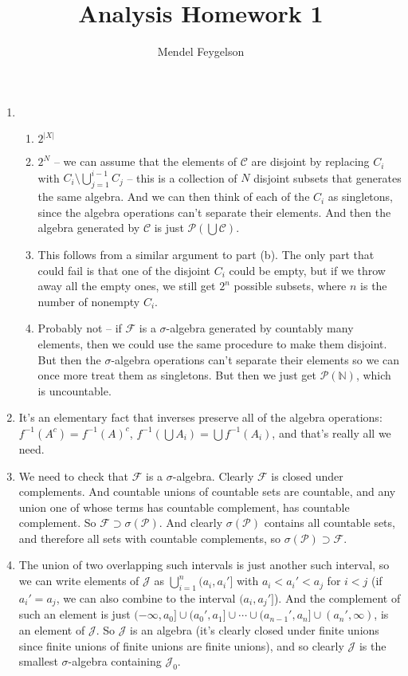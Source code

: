 \documentclass{article}
\title{Analysis Homework 1}
\author{Mendel Feygelson}
\newcommand\C{\mathscr C}
\renewcommand\P{\mathscr P}
\newcommand\F{\mathscr F}
\newcommand\NN{\mathbb N}
\newcommand\J{\mathscr J}
\begin{document}
\maketitle
\begin{enumerate}

  \item 

    \begin{enumerate}

      \item $2^{|X|}$
      \item $2^N$ -- we can assume that the elements of $\C$ are disjoint by replacing $C_i$ with $C_i \setminus \bigcup_{j=1}^{i-1} C_j$ -- this is a collection of $N$ disjoint subsets that generates the same algebra. And we can then think of each of the $C_i$ as singletons, since the algebra operations can't separate their elements. And then the algebra generated by $\C$ is just $\P(\bigcup\C)$.
      \item This follows from a similar argument to part (b). The only part that could fail is that one of the disjoint $C_i$ could be empty, but if we throw away all the empty ones, we still get $2^n$ possible subsets, where $n$ is the number of nonempty $C_i$.
      \item Probably not -- if $\F$ is a $\sigma$-algebra generated by countably many elements, then we could use the same procedure to make them disjoint. But then the $\sigma$-algebra operations can't separate their elements so we can once more treat them as singletons. But then we just get $\P(\NN)$, which is uncountable.

    \end{enumerate}
    
  \item It's an elementary fact that inverses preserve all of the algebra operations: $f^{-1}(A^c) = f^{-1}(A)^c$, $f^{-1}(\bigcup A_i) = \bigcup f^{-1}(A_i)$, and that's really all we need.
  
  \item We need to check that $\F$ is a $\sigma$-algebra. Clearly $\F$ is closed under complements. And countable unions of countable sets are countable, and any union one of whose terms has countable complement, has countable complement. So $\F \supset \sigma(\P)$. And clearly $\sigma(\P)$ contains all countable sets, and therefore all sets with countable complements, so $\sigma(\P) \supset \F$.
  
  \item The union of two overlapping such intervals is just another such interval, so we can write elements of $\J$ as $\bigcup_{i=1}^n (a_i,a_i']$ with $a_i<a_i'<a_j$ for $i<j$ (if $a_i'=a_j$, we can also combine to the interval $(a_i,a_j']$). And the complement of such an element is just $(-\infty,a_0] \cup (a_0',a_1] \cup \cdots \cup (a_{n-1}',a_n] \cup (a_n',\infty)$, is an element of $\J$. So $\J$ is an algebra (it's clearly closed under finite unions since finite unions of finite unions are finite unions), and so clearly $\J$ is the smallest $\sigma$-algebra containing $\J_0$.
  

\end{enumerate}
\end{document}
